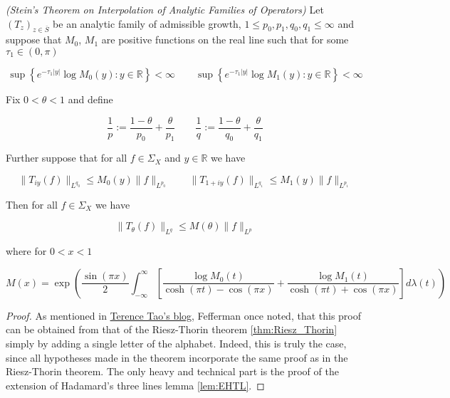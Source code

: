 \begin{mdframed}
	\begin{theorem}\emph{(Stein's Theorem on Interpolation of Analytic Families of Operators)}
		Let $\left( T_z \right)_{z \in \overline{S}}$ be an analytic family of admissible growth, $1 \leqslant p_0,p_1,q_0,q_1 \leqslant \infty$ and suppose that $M_0$, $M_1$ are positive functions on the real line such that for some $\tau_1 \in (0,\pi)$

			\begin{equation}
				\sup\left\{e^{-\tau_1 \vert y \vert} \log M_0(y) : y \in \mathbb{R}\right\} < \infty \qquad \sup\left\{e^{-\tau_1 \vert y \vert} \log M_1(y) : y \in \mathbb{R}\right\} < \infty
			\end{equation}

			Fix $0 < \theta < 1$ and define

			\begin{equation}
				\frac{1}{p} := \frac{1 - \theta}{p_0} + \frac{\theta}{p_1} \qquad \frac{1}{q} := \frac{1 - \theta}{q_0} + \frac{\theta}{q_1}
			\end{equation}

			Further suppose that for all $f \in \Sigma_X$ and $y \in \mathbb{R}$ we have

			\begin{equation}
				\|T_{iy}(f)\|_{L^{q_0}} \leqslant M_0(y)\|f\|_{L^{p_0}} \qquad \|T_{1 + iy}(f)\|_{L^{q_1}} \leqslant M_1(y)\|f\|_{L^{p_1}} 
			\end{equation}

			Then for all $f \in \Sigma_X$ we have

			\begin{equation*}
				\|T_\theta(f)\|_{L^q} \leqslant M(\theta)\|f\|_{L^p}
			\end{equation*}

			where for $0 < x < 1$

			\begin{equation*}
				M(x) = \exp\left( \frac{\sin(\pi x)}{2} \int_{-\infty}^\infty \left[ \frac{\log M_0(t)}{\cosh(\pi t) - \cos(\pi x)} + \frac{\log M_1(t)}{\cosh(\pi t) + \cos(\pi x)}\right] d\lambda(t) \right)
			\end{equation*}
	\end{theorem}
\end{mdframed}

\begin{proof}
	As mentioned in \href{https://terrytao.wordpress.com/2011/05/03/steins-interpolation-theorem/}{Terence Tao's blog}, Fefferman once noted, that this proof can be obtained from that of the Riesz-Thorin theorem \ref{thm:Riesz_Thorin} simply by adding a single letter of the alphabet. Indeed, this is truly the case, since all hypotheses made in the theorem incorporate the same proof as in the Riesz-Thorin theorem. The only heavy and technical part is the proof of the extension of Hadamard's three lines lemma \ref{lem:EHTL}.
\end{proof}

